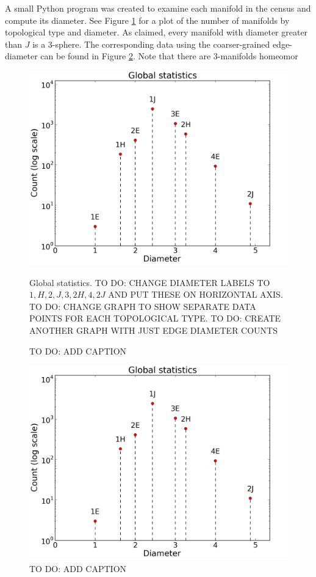 \documentclass[12pt]{article}
\begin{document}
A small Python program was created to examine each manifold in the census and compute its diameter. See Figure \ref{fig:global_statistics} for a plot of the number of manifolds by topological type and diameter. As claimed, every manifold with diameter greater than $J$ is a 3-sphere. The corresponding data using the coarser-grained edge-diameter can be found in Figure \ref{fig:global_statistics_edges}. Note that there are $3$-manifolds homeomor

\begin{figure}
    \begin{center}
    \includegraphics[width=0.6\linewidth]{figures/global_statistics.png}
    \caption{Global statistics. TO DO: CHANGE DIAMETER LABELS TO $1, H, 2, J, 3, 2H, 4, 2J$ AND PUT THESE ON HORIZONTAL AXIS. TO DO: CHANGE GRAPH TO SHOW SEPARATE DATA POINTS FOR EACH TOPOLOGICAL TYPE. TO DO: CREATE ANOTHER GRAPH WITH JUST EDGE DIAMETER COUNTS}
    \end{center}
    \caption{TO DO: ADD CAPTION}
    \label{fig:global_statistics}
\end{figure}

\begin{figure}
    \begin{center}
    \includegraphics[width=0.6\linewidth]{figures/global_statistics.png}
    \end{center}
    \caption{TO DO: ADD CAPTION}
    \label{fig:global_statistics_edges}
\end{figure}
\end{document}
